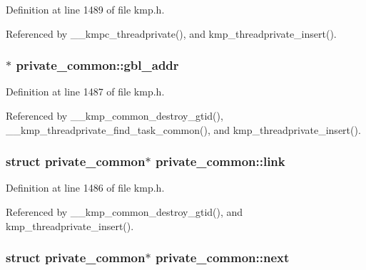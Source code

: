 Definition at line 1489 of file kmp.\-h.



Referenced by \-\_\-\-\_\-kmpc\-\_\-threadprivate(), and kmp\-\_\-threadprivate\-\_\-insert().

\hypertarget{structprivate__common_a3568f36c1e149d053e57e9245b93cc1d}{
\subsubsection[{gbl\-\_\-addr}]{$\ast$ private\-\_\-common\-::gbl\-\_\-addr}}\label{structprivate__common_a3568f36c1e149d053e57e9245b93cc1d}


Definition at line 1487 of file kmp.\-h.



Referenced by \-\_\-\-\_\-kmp\-\_\-common\-\_\-destroy\-\_\-gtid(), \-\_\-\-\_\-kmp\-\_\-threadprivate\-\_\-find\-\_\-task\-\_\-common(), and kmp\-\_\-threadprivate\-\_\-insert().

\hypertarget{structprivate__common_aaf53273197788a197d0c0498d36ce8f4}{
\subsubsection[{link}]{\setlength{\rightskip}{0pt plus 5cm}struct {\bf private\-\_\-common}$\ast$ private\-\_\-common\-::link}}\label{structprivate__common_aaf53273197788a197d0c0498d36ce8f4}


Definition at line 1486 of file kmp.\-h.



Referenced by \-\_\-\-\_\-kmp\-\_\-common\-\_\-destroy\-\_\-gtid(), and kmp\-\_\-threadprivate\-\_\-insert().

\hypertarget{structprivate__common_a9bbe15e09efcd5af8f569dc983a661bc}{
\subsubsection[{next}]{\setlength{\rightskip}{0pt plus 5cm}struct {\bf private\-\_\-common}$\ast$ private\-\_\-common\-::next}}\label{structprivate__common_a9bbe15e09efcd5af8f569dc983a661bc}


